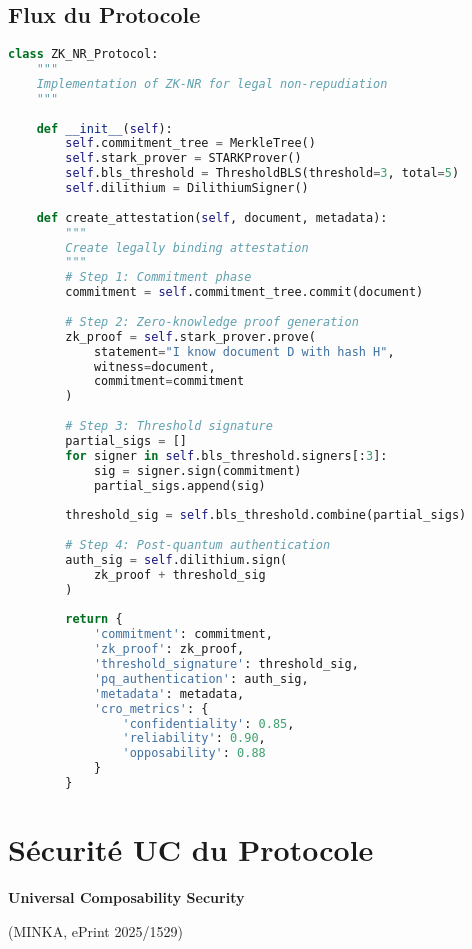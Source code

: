 \subsection{Flux du Protocole}
\begin{lstlisting}[language=Python, caption=Implementation of ZK-NR for legal non-repudiation]
class ZK_NR_Protocol:
    """
    Implementation of ZK-NR for legal non-repudiation
    """
    
    def __init__(self):
        self.commitment_tree = MerkleTree()
        self.stark_prover = STARKProver()
        self.bls_threshold = ThresholdBLS(threshold=3, total=5)
        self.dilithium = DilithiumSigner()
    
    def create_attestation(self, document, metadata):
        """
        Create legally binding attestation
        """
        # Step 1: Commitment phase
        commitment = self.commitment_tree.commit(document)
        
        # Step 2: Zero-knowledge proof generation
        zk_proof = self.stark_prover.prove(
            statement="I know document D with hash H",
            witness=document,
            commitment=commitment
        )
        
        # Step 3: Threshold signature
        partial_sigs = []
        for signer in self.bls_threshold.signers[:3]:
            sig = signer.sign(commitment)
            partial_sigs.append(sig)
        
        threshold_sig = self.bls_threshold.combine(partial_sigs)
        
        # Step 4: Post-quantum authentication
        auth_sig = self.dilithium.sign(
            zk_proof + threshold_sig
        )
        
        return {
            'commitment': commitment,
            'zk_proof': zk_proof,
            'threshold_signature': threshold_sig,
            'pq_authentication': auth_sig,
            'metadata': metadata,
            'cro_metrics': {
                'confidentiality': 0.85,
                'reliability': 0.90,
                'opposability': 0.88
            }
        }
\end{lstlisting}

\section{Sécurité UC du Protocole}
\textbf{Universal Composability Security}

(MINKA, ePrint 2025/1529)

